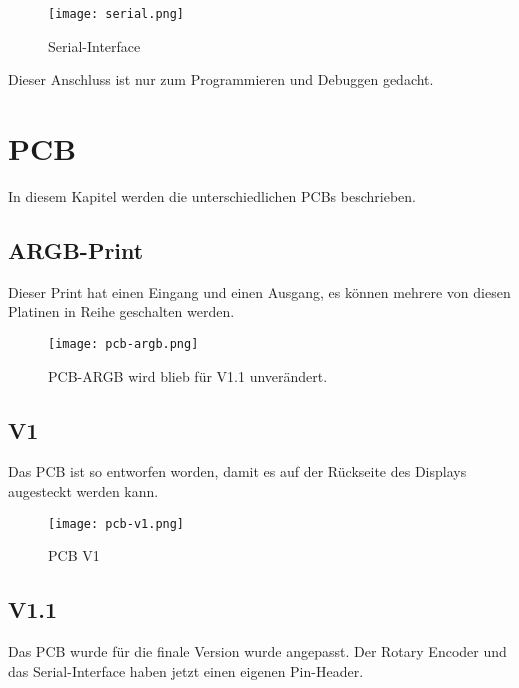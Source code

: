             \begin{figure}[h!]
                \centering
                \texttt{[image: serial.png]}
                \caption{Serial-Interface}
                \label{fig:sch9}

            \end{figure}
        
        Dieser Anschluss ist nur zum Programmieren und Debuggen gedacht.
    \newpage
    
    \section{PCB}

    In diesem Kapitel werden die unterschiedlichen PCBs beschrieben.


        \subsection{ARGB-Print}
        Dieser Print hat einen Eingang und einen Ausgang, es können mehrere von diesen 
        Platinen in Reihe geschalten werden.

        \begin{figure}[h!]
            \centering
            \texttt{[image: pcb-argb.png]}
            \caption{PCB-ARGB wird blieb für V1.1 unverändert.}
            \label{fig:pcbargb}

        \end{figure}

        \subsection{V1}

        Das PCB ist so entworfen worden, damit es auf der Rückseite des Displays augesteckt 
        werden kann.

            \begin{figure}[h!]
                \centering
                \texttt{[image: pcb-v1.png]}
                \caption{PCB V1}
                \label{fig:pcb1}

            \end{figure}

        \newpage
        \subsection{V1.1}

        Das PCB wurde für die finale Version wurde angepasst. Der Rotary Encoder und das Serial-Interface
        haben jetzt einen eigenen Pin-Header.

